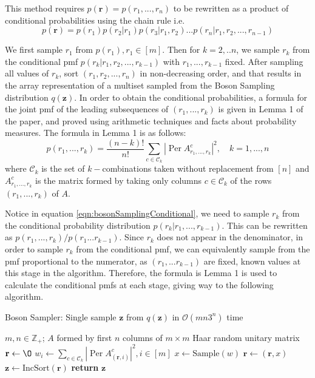 \documentclass[11pt]{article}
\theoremstyle{theorem}
\theoremstyle{theorem}
\theoremstyle{remark}
\theoremstyle{note}
\theoremstyle{plain}
\theoremstyle{definition}
\DeclareMathOperator*{\Per}{\mathrm{Per}}
\begin{document}
This method requires $p(\mathbf{r}) = p(r_1, ... , r_n)$ to be rewritten as a product of conditional probabilities using the chain rule i.e.
\begin{equation}\label{eqn:bosonSamplingConditional}
p(\mathbf{r}) = p(r_1)p(r_2 | r_1) p (r_3 | r_1, r_2) ... p(r_n | r_1, r_2, ... , r_{n-1})
\end{equation}

We first sample $r_1$ from $p(r_1), r_1 \in [m]$. Then for $k=2, .. n$, we sample $r_k$ from the conditional pmf $p(r_k | r_1, r_2, ... , r_{k-1})$ with $r_1, ... , r_{k-1}$ fixed. After sampling all values of $r_k$, sort $(r_1, r_2, ... , r_n)$ in non-decreasing order, and that results in the array representation of a multiset sampled from the Boson Sampling distribution $q(\mathbf{z})$. In order to obtain the conditional probabilities, a formula for the joint pmf of the leading subsequences of $(r_1, ... , r_k)$ is given in Lemma 1 of the paper, and proved using arithmetic techniques and facts about probability measures. The formula in Lemma 1 is as follows:
\begin{equation}
p(r_1, ... , r_k) = \frac{(n-k)!}{n!} \sum_{c \in \mathcal{C}_k} \left| \Per A_{r_1, ... , r_k}^c \right| ^2 , \quad k = 1, ... , n
\end{equation}
where $\mathcal{C}_k$ is the set of $k-$combinations taken without replacement from $[n]$ and $A_{r_1, ... , r_k}^c$ is the matrix formed by taking only columns $c \in \mathcal{C}_k$ of the rows $(r_1, ... , r_k)$ of $A$.

Notice in equation \ref{eqn:bosonSamplingConditional}, we need to sample $r_k$ from the conditional probability distribution $p(r_k | r_1, ... , r_{k-1})$. This can be rewritten as $p(r_1, ... , r_k)/p(r_1 ... r_{k-1})$. Since $r_k$ does not appear in the denominator, in order to sample $r_k$ from the conditional pmf, we can equivalently sample from the pmf proportional to the numerator, as $(r_1, ... r_{k-1})$ are fixed, known values at this stage in the algorithm. Therefore, the formula is Lemma 1 is used to calculate the conditional pmfs at each stage, giving way to the following algorithm.

\begin{algorithm}
\caption{Boson Sampler: Single sample $\mathbf{z}$ from $q(\mathbf{z})$ in $\mathcal{O}(mn3^n)$ time}
\begin{algorithmic}[1]
\Require $m, n \in \mathbb{Z}_+$; $A$ formed by first $n$ columns of $m \times m$ Haar random unitary matrix
\State $\mathbf{r} \leftarrow \O $
\State $w_i \leftarrow \sum_{c \in \mathcal{C}_k} \left| \Per A_{(\mathbf{r}, i)}^c \right| ^2, i \in [m] $
\State $x \leftarrow \text{Sample}(w)$
\State $\mathbf{r} \leftarrow (\mathbf{r}, x)$
\EndFor
\State $\mathbf{z} \leftarrow \text{IncSort}(\mathbf{r})$
\State \textbf{return} $\mathbf{z}$
\end{algorithmic}
\end{algorithm}
\end{document}
